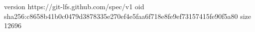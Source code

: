 version https://git-lfs.github.com/spec/v1
oid sha256:c8658b41b0c0479d3878335e270ef4e5faa6f718e8fe9ef73157415fe90f5a80
size 12696
